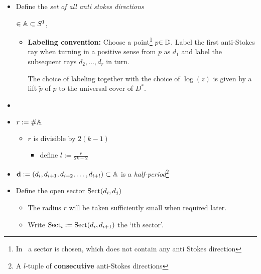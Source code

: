 \begin{defn}
  \begin{itemize}
    \item Define the \emph{set of all anti stokes directions}
      $\in\mathbb{A}\subset S^1$,
      \begin{itemize}
        \item
          \textbf{Labeling convention:}
          Choose a point\footnote{In~\cite{thboalch} a sector is chosen, which
          does not contain any anti Stokes direction}
          \textcolor{yellow!60!black}{$p$}$\in \mathbb{D}$.
          Label the first anti-Stokes ray when turning in a positive sense from
          $p$ as $d_1$ and label the subsequent rays $d_2,\dots,d_r$ in turn.
          \begin{rem}
            The choice of labeling together with the choice of $\log(z)$ is
            given by a lift $\tilde p$ of $p$ to the universal cover of $D^*$.
          \end{rem}
      \end{itemize}
  \end{itemize}
  \begin{itemize}
    \item
    \item $r:=\#\mathbb{A}$
      \begin{itemize}
        \item $r$ is divisible by $2(k-1)$
          \begin{itemize}
            \item define $l:=\frac{r}{2k-2}$
          \end{itemize}
      \end{itemize}
    \item $\textbf{d}:=(d_i,d_{i+1},d_{i+2},\dots,d_{i+l})\subset\mathbb{A}$ is a
      \emph{half-period}\footnote{A $l$-tuple of \textbf{consecutive}
      anti-Stokes directions}
    \item Define the open sector $\operatorname{Sect}(d_i,d_j)$
      \begin{itemize}
        \item The radius \textcolor{green!40!black}{$r$} will be taken
          sufficiently small when required later.
        \item Write $\operatorname{Sect}_i:= \operatorname{Sect}(d_i,d_{i+1})$ the ‘ith sector’.
          \begin{itemize}

\end{itemize}
\end{itemize}
\end{itemize}
\end{defn}
